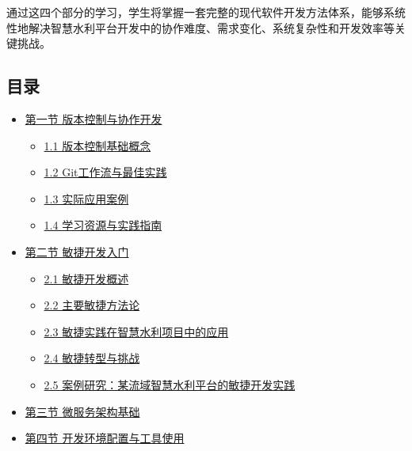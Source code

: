 通过这四个部分的学习，学生将掌握一套完整的现代软件开发方法体系，能够系统性地解决智慧水利平台开发中的协作难度、需求变化、系统复杂性和开发效率等关键挑战。

\subsection{目录}\label{ux76eeux5f55}

\begin{itemize}
\item
  \href{section03-01.md}{第一节 版本控制与协作开发}

  \begin{itemize}
  \tightlist
  \item
    \href{section03-01-01.md}{1.1 版本控制基础概念}
  \item
    \href{section03-01-02.md}{1.2 Git工作流与最佳实践}
  \item
    \href{section03-01-03.md}{1.3 实际应用案例}
  \item
    \href{section03-01-04.md}{1.4 学习资源与实践指南}
  \end{itemize}
\item
  \href{section03-02.md}{第二节 敏捷开发入门}

  \begin{itemize}
  \tightlist
  \item
    \href{section03-02-01.md}{2.1 敏捷开发概述}
  \item
    \href{section03-02-02.md}{2.2 主要敏捷方法论}
  \item
    \href{section03-02-03.md}{2.3 敏捷实践在智慧水利项目中的应用}
  \item
    \href{section03-02-04.md}{2.4 敏捷转型与挑战}
  \item
    \href{section03-02-05.md}{2.5
    案例研究：某流域智慧水利平台的敏捷开发实践}
  \end{itemize}
\item
  \href{section03-03.md}{第三节 微服务架构基础}
\item
  \href{section03-04.md}{第四节 开发环境配置与工具使用}
\end{itemize}
